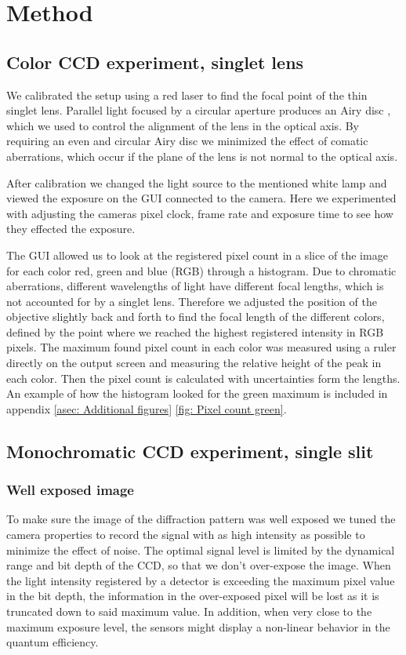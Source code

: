 \documentclass{emulateapj}
\begin{document}
\section{Method}
\label{sec:method}
\subsection{Color CCD experiment, singlet lens}
\label{subsec: Method/color CCD}
We calibrated the setup using a red laser to find the focal point of the thin singlet lens. Parallel light focused by a circular aperture produces an Airy disc \citep{lab1}, which we used to control the alignment of the lens in the optical axis. By requiring an even and circular Airy disc we minimized the effect of comatic aberrations, which occur if the plane of the lens is not normal to the optical axis.

After calibration we changed the light source to the mentioned white lamp and viewed the exposure on the GUI connected to the camera. Here we experimented with adjusting the cameras pixel clock, frame rate and exposure time to see how they effected the exposure.

The GUI allowed us to look at the registered pixel count in a slice of the image for each color red, green and blue (RGB) through a histogram. Due to chromatic aberrations, different wavelengths of light have different focal lengths, which is not accounted for by a singlet lens. Therefore we adjusted the position of the objective slightly back and forth to find the focal length of the different colors, defined by the point where we reached the highest registered intensity in RGB pixels. The maximum found pixel count in each color was measured using a ruler directly on the output screen and measuring the relative height of the peak in each color. Then the pixel count is calculated with uncertainties form the lengths. An example of how the histogram looked for the green maximum is included in appendix \ref{asec: Additional figures} \cref{fig: Pixel count green}.

\subsection{Monochromatic CCD experiment, single slit}
\label{subsec: Method/Record mono CCD}

\subsubsection{Well exposed image}
\label{subsubsec: Method/Well exposed image}
To make sure the image of the diffraction pattern was well exposed we tuned the camera properties to record the signal with as high intensity as possible to minimize the effect of noise. The optimal signal level is limited by the dynamical range and bit depth of the CCD, so that we don't over-expose the image. When the light intensity registered by a detector is exceeding the maximum pixel value in the bit depth, the information in the over-exposed pixel will be lost as it is truncated down to said maximum value. In addition, when very close to the maximum exposure level, the sensors might display a non-linear behavior in the quantum efficiency.
\end{document}
